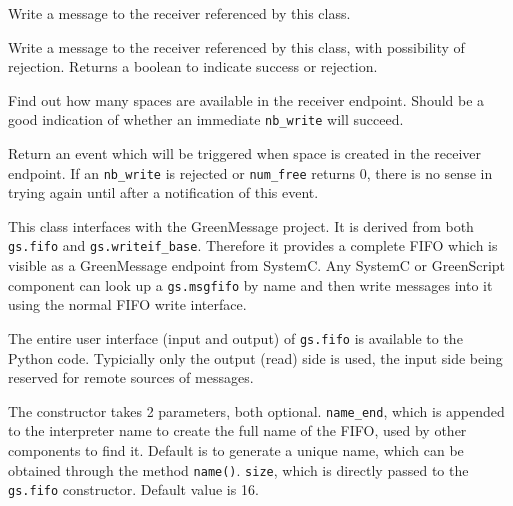 \documentclass[12pt,oneside]{gsbook}
\begin{document}
\begin{methods}

 {Write a message to the receiver referenced by
  this class.}

 {Write a message to the receiver referenced by
  this class, with possibility of rejection.  Returns a boolean to
  indicate success or rejection.}

 {Find out how many spaces are available in the
  receiver endpoint.  Should be a good indication of whether an
  immediate \texttt{nb\_write} will succeed.}

 {Return an event which will be triggered
  when space is created in the receiver endpoint.  If an
  \texttt{nb\_write} is rejected or \texttt{num\_free} returns 0, there
  is no sense in trying again until after a notification of this
  event.}

\end{methods}



 { This class interfaces with the GreenMessage
  project.  It is derived from both \texttt{gs.fifo} and
  \texttt{gs.writeif\_base}.  Therefore it provides a complete
  FIFO which is visible as a GreenMessage endpoint from SystemC.
  Any SystemC or GreenScript component can look up a \texttt{gs.msgfifo}
  by name and then write messages into it using the normal FIFO write
  interface.

  The entire user interface (input and output) of \texttt{gs.fifo} is
  available to the Python code.  Typicially only the output (read)
  side is used, the input side being reserved for remote sources of
  messages.

  The constructor takes 2 parameters, both optional.
  \texttt{name\_end}, which is appended to the interpreter name to
  create the full name of the FIFO, used by other components to find it.
  Default is to generate a unique name, which can be obtained through
  the method \texttt{name()}.
  \texttt{size}, which is directly passed to the \texttt{gs.fifo}
  constructor.  Default value is 16.
  }
\end{document}
